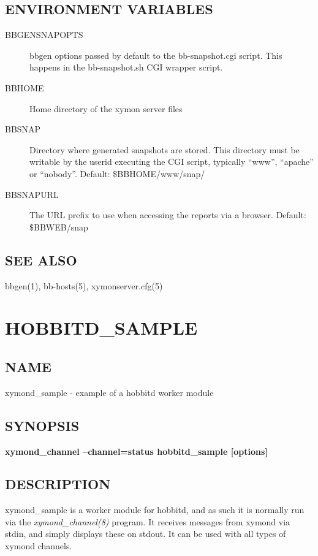 \subsection{ENVIRONMENT VARIABLES}
\begin{description}
\item[BBGENSNAPOPTS] bbgen options passed by default to the
  bb-snapshot.cgi script. This happens in the bb-snapshot.sh CGI
  wrapper script. 

\item[BBHOME] Home directory of the xymon server files 
\item[BBSNAP] Directory where generated snapshots are stored. This
  directory must be writable by the userid executing the CGI script,
  typically ``www'', ``apache'' or ``nobody''. Default:
  \$BBHOME/www/snap/ 

\item[BBSNAPURL] The URL prefix to use when accessing the reports via
  a browser. Default: \$BBWEB/snap 



\end{description}
\subsection{SEE ALSO}
bbgen(1), bb-hosts(5), xymonserver.cfg(5) 


%
\newpage
\section{HOBBITD\_SAMPLE}
\subsection{NAME}
 xymond\_sample - example of a hobbitd worker module \subsection{SYNOPSIS}
\textbf{xymond\_channel --channel=status hobbitd\_sample [options]}

 
\subsection{DESCRIPTION}
 xymond\_sample is a worker module for hobbitd, and as such it is
 normally run via the \emph{xymond\_channel(8)} program. It receives
 messages from xymond via stdin, and simply displays these on
 stdout. It can be used with all types of xymond channels. 


